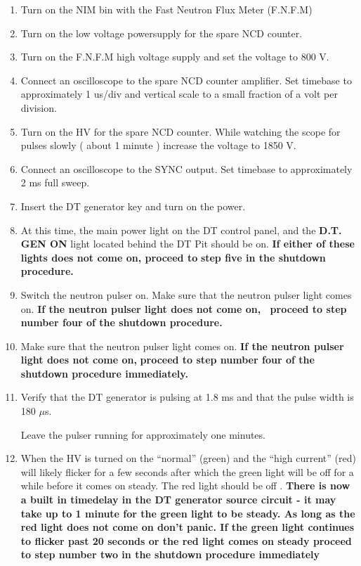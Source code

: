 \begin{enumerate}
\item\checkbox Turn on the NIM bin with the Fast Neutron Flux Meter (F.N.F.M)

\item\checkbox Turn on the low voltage powersupply for the spare NCD counter.


\item\checkbox Turn on the F.N.F.M high voltage supply and set the
voltage to 800 V.

\item\checkbox Connect an oscilloscope to the spare NCD counter amplifier. Set
timebase to approximately 1 us/div and vertical scale to a small fraction of a
volt per division.


\item\checkbox Turn on the HV for the spare NCD counter. While watching the scope
for pulses slowly ( about 1 minute ) increase the voltage to 1850 V.  

\item\checkbox
   Connect an oscilloscope to the SYNC output. Set timebase to 
approximately 2 ms full sweep.

\item\checkbox
  Insert the DT generator key and turn on the power.

\item\checkbox
   At this time, the main power light on the DT control panel, and
   the {\bf D.T. GEN ON} light located behind the DT Pit should be on.
   {\bf If either of these lights does not come on, proceed to}
   {\bf step five in the shutdown procedure. }


\item\checkbox
  Switch the neutron pulser on.  Make sure that the neutron pulser light
comes on.  {\bf If the neutron pulser light does not come on, \
proceed to step number four of the shutdown procedure.} 


\item\checkbox
 Make sure that the neutron pulser light comes on. 
 {\bf If the neutron pulser light does not come on, }
 {\bf proceed to step number four of the shutdown procedure
 immediately.} 


\item\checkbox
 Verify that the DT generator is pulsing at  1.8 ms and that the pulse width
is 180 ${\mu}$s.  

\checkitem Leave the pulser running for approximately one minutes.

\item\checkbox
  When the HV is turned on the ``normal''  (green) and the ``high current'' (red)
 will likely flicker for a few  seconds after which the green light will be off for
a while before it comes on steady. The red light should be off .
 { \bf There is now a built in timedelay in the DT generator source circuit - it may
take up to 1 minute for the green light to be steady. As long as the red light does
not  come on don't panic. If the green light continues to flicker past 20 seconds or the 
  red light comes on steady proceed to step number two in the
 shutdown procedure immediately } 



\end{enumerate}
